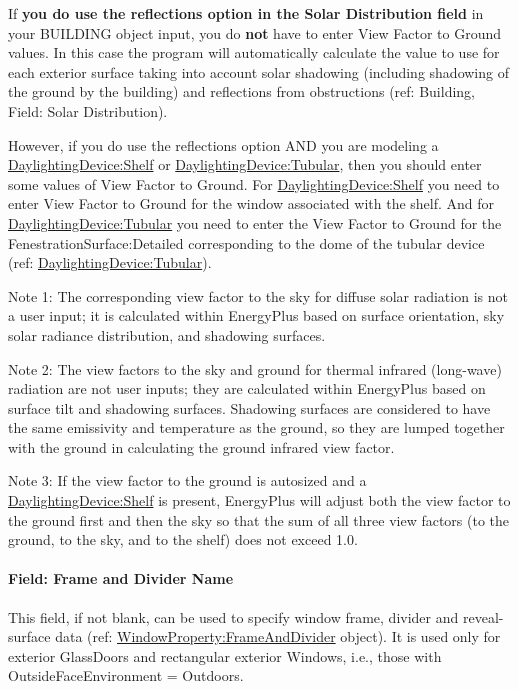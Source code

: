If \textbf{you do use the reflections option in the Solar Distribution field} in your BUILDING object input, you do \textbf{not} have to enter View Factor to Ground values. In this case the program will automatically calculate the value to use for each exterior surface taking into account solar shadowing (including shadowing of the ground by the building) and reflections from obstructions (ref: Building, Field: Solar Distribution).

However, if you do use the reflections option AND you are modeling a \hyperref[daylightingdeviceshelf]{DaylightingDevice:Shelf} or \hyperref[daylightingdevicetubular]{DaylightingDevice:Tubular}, then you should enter some values of View Factor to Ground. For \hyperref[daylightingdeviceshelf]{DaylightingDevice:Shelf} you need to enter View Factor to Ground for the window associated with the shelf. And for \hyperref[daylightingdevicetubular]{DaylightingDevice:Tubular} you need to enter the View Factor to Ground for the FenestrationSurface:Detailed corresponding to the dome of the tubular device (ref: \hyperref[daylightingdevicetubular]{DaylightingDevice:Tubular}).

Note 1: The corresponding view factor to the sky for diffuse solar radiation is not a user input; it is calculated within EnergyPlus based on surface orientation, sky solar radiance distribution, and shadowing surfaces.

Note 2: The view factors to the sky and ground for thermal infrared (long-wave) radiation are not user inputs; they are calculated within EnergyPlus based on surface tilt and shadowing surfaces. Shadowing surfaces are considered to have the same emissivity and temperature as the ground, so they are lumped together with the ground in calculating the ground infrared view factor.

Note 3: If the view factor to the ground is autosized and a \hyperref[daylightingdeviceshelf]{DaylightingDevice:Shelf} is present, EnergyPlus will adjust both the view factor to the ground first and then the sky so that the sum of all three view factors (to the ground, to the sky, and to the shelf) does not exceed 1.0.

\paragraph{Field: Frame and Divider Name}\label{field-frame-and-divider-name-2}

This field, if not blank, can be used to specify window frame, divider and reveal-surface data (ref: \hyperref[windowpropertyframeanddivider]{WindowProperty:FrameAndDivider} object). It is used only for exterior GlassDoors and rectangular exterior Windows, i.e., those with OutsideFaceEnvironment = Outdoors.


